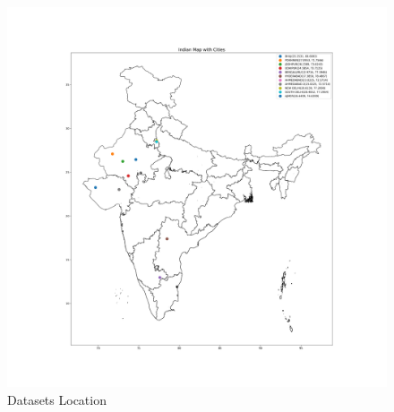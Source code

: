 \documentclass[a4paper,fleqn]{cas-sc}
\begin{document}
\begin{figure}[!ht]
\centering
\includegraphics[width=\textwidth]{AMod India_Map.png}
\caption{Datasets Location }
\label{fig:Data location}
\end{figure}   
\end{document}
